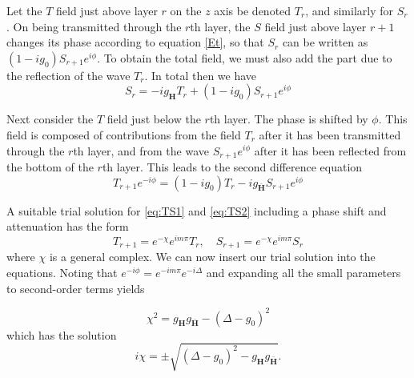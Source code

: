 \documentclass[12pt,oneside,notitlepage,abstracton,a4paper]{scrartcl}
\begin{document}
Let the $T$ field just above layer $r$ on the $z$ axis be denoted $T_r$, and similarly for $S_r$. On being transmitted through the $r$th layer, the $S$ field just above layer $r+1$ changes its phase according to equation \ref{Et}, so that $S_r$ can be written as $(1-ig_0)S_{r+1}e^{i\phi}$. To obtain the total field, we must also add the part due to the reflection of the wave $T_r$. In total then we have
\begin{equation}\label{eq:TS1}
 S_r=-ig_\mathbf{H}T_r+(1-ig_0)S_{r+1}e^{i\phi}
\end{equation}

Next consider the $T$ field just below the $r$th layer. The phase is shifted by $\phi$. This field is composed of contributions from the field $T_r$ after it has been transmitted through the $r$th layer, and from the wave $S_{r+1}e^{i\phi}$ after it has been reflected from the bottom of the $r$th layer. This leads to the second difference equation
\begin{equation}\label{eq:TS2}
 T_{r+1}e^{-i\phi}=(1-ig_0)T_r-ig_\mathbf{\bar{H}}S_{r+1}e^{i\phi}
\end{equation}

A suitable trial solution for \ref{eq:TS1} and \ref{eq:TS2} including a phase shift and attenuation has the form
\begin{equation}
T_{r+1}=e^{-\chi}e^{im\pi}T_r, \quad
S_{r+1}=e^{-\chi}e^{im\pi}S_r
\end{equation}
where $\chi$ is a general complex. We can now insert our trial solution into the equations. Noting that $e^{-i\phi}=e^{-im\pi}e^{-i\Delta}$ and expanding all the small parameters to second-order terms yields

\begin{equation}
\chi^2=g_\mathbf{H}g_\mathbf{\bar{H}}-(\Delta-g_0)^2
\end{equation}
which has the solution
\begin{equation}
i\chi=\pm \sqrt{(\Delta-g_0)^2-g_\mathbf{H}g_\mathbf{\bar{H}}}.
\end{equation}
\end{document}
